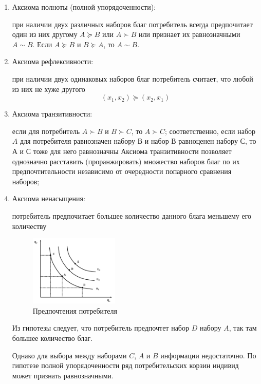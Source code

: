 \documentclass[reqno]{article}
\theoremstyle{definition}
\theoremstyle{definition}
\theoremstyle{definition}
\theoremstyle{definition}
\theoremstyle{definition}
\theoremstyle{definition}
\theoremstyle{definition}
\theoremstyle{definition}
\theoremstyle{definition}
\begin{document}
			\begin{enumerate}
				\item Аксиома полноты (полной упорядоченности): 
				
				при наличии двух различных наборов благ потребитель всегда предпочитает один из них другому $A \succeq B$ или $A \succ B$ или признает их равнозначными $A \sim B$. Если $A \succeq B$ и $B \succeq A$, то $A \sim B$.
				
				\item Аксиома рефлексивности:
				
				при наличии двух одинаковых наборов благ потребитель считает, что любой из них не хуже другого
				$$(x_1, x_2) \succeq (x_2, x_1)$$
				
				\item Аксиома транзитивности: 
				
				если для потребитель $A \succ B$ и $B \succ C$, то $A \succ C$; соответственно, если набор $A$ для потребителя равнозначен набору В и набор В равноценен набору С, то А и С тоже для него равнозначны Аксиома транзитивности позволяет однозначно расставить (проранжировать) множество наборов благ по их предпочтительности независимо от очередности попарного сравнения наборов;
				
				\item Аксиома ненасыщения: 
				
				потребитель предпочитает большее количество данного блага меньшему его количеству
				
				
				\begin{figure}[h!]
					\centering
					\includegraphics[width=0.4\textwidth]{Кривые_безразличия}
					\caption{Предпочтения потребителя}
				\end{figure}
			
				Из гипотезы следует, что потребитель предпочтет набор $D$ набору $A$, так там большее количество благ.
				
				Однако для выбора между наборами $C$, $A$ и $B$ информации недостаточно. По гипотезе полной упорядоченности ряд потребительских корзин индивид может признать равнозначными.
				

\end{enumerate}
\end{document}
